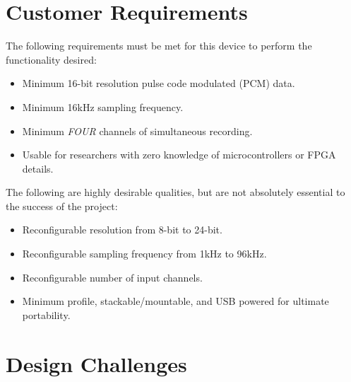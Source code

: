 \documentclass[10pt]{article}
\begin{document}
\section{Customer Requirements}
The following requirements must be met for this device to perform the functionality desired:
\begin{itemize}
\item
Minimum 16-bit resolution pulse code modulated (PCM) data.
\item
Minimum 16kHz sampling frequency.
\item
Minimum \emph{FOUR} channels of simultaneous recording.
\item
Usable for researchers with zero knowledge of microcontrollers or FPGA details.
\end{itemize}
The following are highly desirable qualities, but are not absolutely essential to the success of the project:
\begin{itemize}
\item
Reconfigurable resolution from 8-bit to 24-bit.
\item
Reconfigurable sampling frequency from 1kHz to 96kHz.
\item
Reconfigurable number of input channels.
\item
Minimum profile, stackable/mountable, and USB powered for ultimate portability.
\end{itemize}
\section{Design Challenges}
\end{document}

